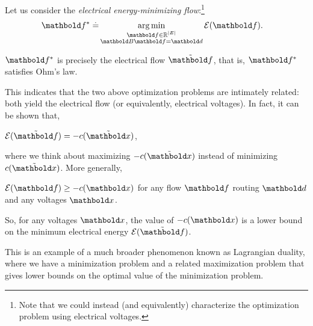 Let us consider the \emph{electrical energy-minimizing flow}:\footnote{Note that we could instead (and equivalently) characterize the optimization problem using electrical voltages.} \begin{align}
    \s{\vf} \defeq &\argmin_{\substack{\vf \in \R^{|\sE|} \\ \mB\vf = \vd}} \e(\vf). \label{eq:electrical_energy_minimizing_flow}
\end{align}

\begin{exc}\label{exc:electrical_flow_energy_minimizing}
$\s{\vf}$ is precisely the electrical flow $\ef$, that is, $\s{\vf}$ satisfies Ohm's law.
\end{exc}

This indicates that the two above optimization problems are intimately related: both yield the electrical flow (or equivalently, electrical voltages). In fact, it can be shown that, \begin{exc}\label{exc:electrical_energy_strong_duality}
$\e(\ef) = -c(\elx)$,
\end{exc}\noindent where we think about maximizing $-c(\elx)$ instead of minimizing $c(\elx)$. More generally, \begin{exc}\label{exc:electrical_energy_weak_duality}
$\e(\vf) \geq -c(\vx)$ for any flow $\vf$ routing $\vd$ and any voltages $\vx$.
\end{exc}\noindent So, for any voltages $\vx$, the value of $-c(\vx)$ is a lower bound on the minimum electrical energy $\e(\ef)$.

This is an example of a much broader phenomenon known as Lagrangian duality, where we have a minimization problem and a related maximization problem that gives lower bounds on the optimal value of the minimization problem.